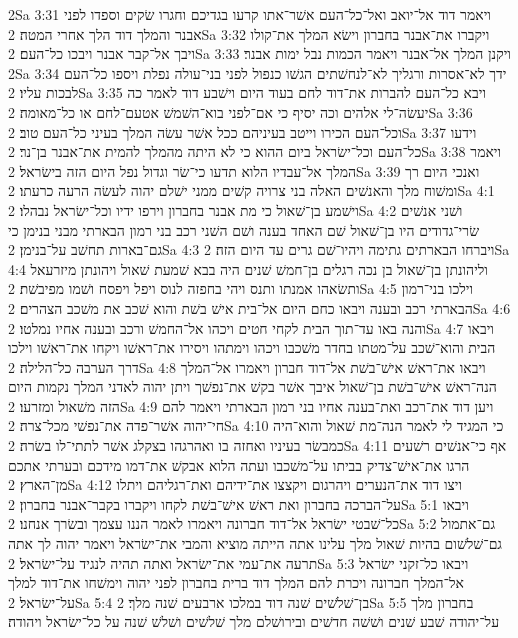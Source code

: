 2Sa 3:31  ויאמר דוד אל־יואב ואל־כל־העם אשׁר־אתו קרעו בגדיכם וחגרו שׂקים וספדו לפני אבנר והמלך דוד הלך אחרי המטה׃
2Sa 3:32  ויקברו את־אבנר בחברון וישׂא המלך את־קולו ויבך אל־קבר אבנר ויבכו כל־העם׃
2Sa 3:33  ויקנן המלך אל־אבנר ויאמר הכמות נבל ימות אבנר׃
2Sa 3:34  ידך לא־אסרות ורגליך לא־לנחשׁתים הגשׁו כנפול לפני בני־עולה נפלת ויספו כל־העם לבכות עליו׃
2Sa 3:35  ויבא כל־העם להברות את־דוד לחם בעוד היום וישׁבע דוד לאמר כה יעשׂה־לי אלהים וכה יסיף כי אם־לפני בוא־השׁמשׁ אטעם־לחם או כל־מאומה׃
2Sa 3:36  וכל־העם הכירו וייטב בעיניהם ככל אשׁר עשׂה המלך בעיני כל־העם טוב׃
2Sa 3:37  וידעו כל־העם וכל־ישׂראל ביום ההוא כי לא היתה מהמלך להמית את־אבנר בן־נר׃
2Sa 3:38  ויאמר המלך אל־עבדיו הלוא תדעו כי־שׂר וגדול נפל היום הזה בישׂראל׃
2Sa 3:39  ואנכי היום רך ומשׁוח מלך והאנשׁים האלה בני צרויה קשׁים ממני ישׁלם יהוה לעשׂה הרעה כרעתו׃
2Sa 4:1  וישׁמע בן־שׁאול כי מת אבנר בחברון וירפו ידיו וכל־ישׂראל נבהלו׃
2Sa 4:2  ושׁני אנשׁים שׂרי־גדודים היו בן־שׁאול שׁם האחד בענה ושׁם השׁני רכב בני רמון הבארתי מבני בנימן כי גם־בארות תחשׁב על־בנימן׃
2Sa 4:3  ויברחו הבארתים גתימה ויהיו־שׁם גרים עד היום הזה׃
2Sa 4:4  וליהונתן בן־שׁאול בן נכה רגלים בן־חמשׁ שׁנים היה בבא שׁמעת שׁאול ויהונתן מיזרעאל ותשׂאהו אמנתו ותנס ויהי בחפזה לנוס ויפל ויפסח ושׁמו מפיבשׁת׃
2Sa 4:5  וילכו בני־רמון הבארתי רכב ובענה ויבאו כחם היום אל־בית אישׁ בשׁת והוא שׁכב את משׁכב הצהרים׃
2Sa 4:6  והנה באו עד־תוך הבית לקחי חטים ויכהו אל־החמשׁ ורכב ובענה אחיו נמלטו׃
2Sa 4:7  ויבאו הבית והוא־שׁכב על־מטתו בחדר משׁכבו ויכהו וימתהו ויסירו את־ראשׁו ויקחו את־ראשׁו וילכו דרך הערבה כל־הלילה׃
2Sa 4:8  ויבאו את־ראשׁ אישׁ־בשׁת אל־דוד חברון ויאמרו אל־המלך הנה־ראשׁ אישׁ־בשׁת בן־שׁאול איבך אשׁר בקשׁ את־נפשׁך ויתן יהוה לאדני המלך נקמות היום הזה משׁאול ומזרעו׃
2Sa 4:9  ויען דוד את־רכב ואת־בענה אחיו בני רמון הבארתי ויאמר להם חי־יהוה אשׁר־פדה את־נפשׁי מכל־צרה׃
2Sa 4:10  כי המגיד לי לאמר הנה־מת שׁאול והוא־היה כמבשׂר בעיניו ואחזה בו ואהרגהו בצקלג אשׁר לתתי־לו בשׂרה׃
2Sa 4:11  אף כי־אנשׁים רשׁעים הרגו את־אישׁ־צדיק בביתו על־משׁכבו ועתה הלוא אבקשׁ את־דמו מידכם ובערתי אתכם מן־הארץ׃
2Sa 4:12  ויצו דוד את־הנערים ויהרגום ויקצצו את־ידיהם ואת־רגליהם ויתלו על־הברכה בחברון ואת ראשׁ אישׁ־בשׁת לקחו ויקברו בקבר־אבנר בחברון׃
2Sa 5:1  ויבאו כל־שׁבטי ישׂראל אל־דוד חברונה ויאמרו לאמר הננו עצמך ובשׂרך אנחנו׃
2Sa 5:2  גם־אתמול גם־שׁלשׁום בהיות שׁאול מלך עלינו אתה הייתה מוציא והמבי את־ישׂראל ויאמר יהוה לך אתה תרעה את־עמי את־ישׂראל ואתה תהיה לנגיד על־ישׂראל׃
2Sa 5:3  ויבאו כל־זקני ישׂראל אל־המלך חברונה ויכרת להם המלך דוד ברית בחברון לפני יהוה וימשׁחו את־דוד למלך על־ישׂראל׃
2Sa 5:4  בן־שׁלשׁים שׁנה דוד במלכו ארבעים שׁנה מלך׃
2Sa 5:5  בחברון מלך על־יהודה שׁבע שׁנים ושׁשׁה חדשׁים ובירושׁלם מלך שׁלשׁים ושׁלשׁ שׁנה על כל־ישׂראל ויהודה׃
